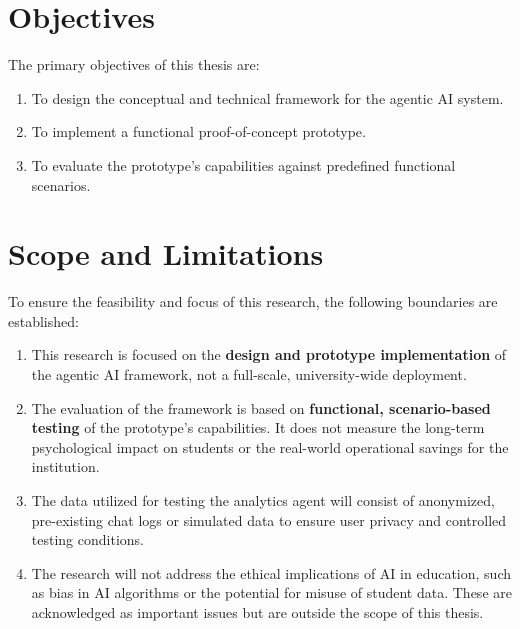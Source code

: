 
\section{Objectives}
\label{sec:objectives}

The primary objectives of this thesis are:
\begin{enumerate}
    \item To design the conceptual and technical framework for the agentic AI system.
    \item To implement a functional proof-of-concept prototype.
    \item To evaluate the prototype's capabilities against predefined functional scenarios.
\end{enumerate}


\section{Scope and Limitations}
\label{sec:scope_and_limitations}

To ensure the feasibility and focus of this research, the following boundaries are established:

\begin{enumerate}
    \item This research is focused on the \textbf{design and prototype implementation} of the agentic AI framework, not a full-scale, university-wide deployment.
    \item The evaluation of the framework is based on \textbf{functional, scenario-based testing} of the prototype's capabilities. It does not measure the long-term psychological impact on students or the real-world operational savings for the institution.
    \item The data utilized for testing the analytics agent will consist of anonymized, pre-existing chat logs or simulated data to ensure user privacy and controlled testing conditions.
    \item The research will not address the ethical implications of AI in education, such as bias in AI algorithms or the potential for misuse of student data. These are acknowledged as important issues but are outside the scope of this thesis.
\end{enumerate}



